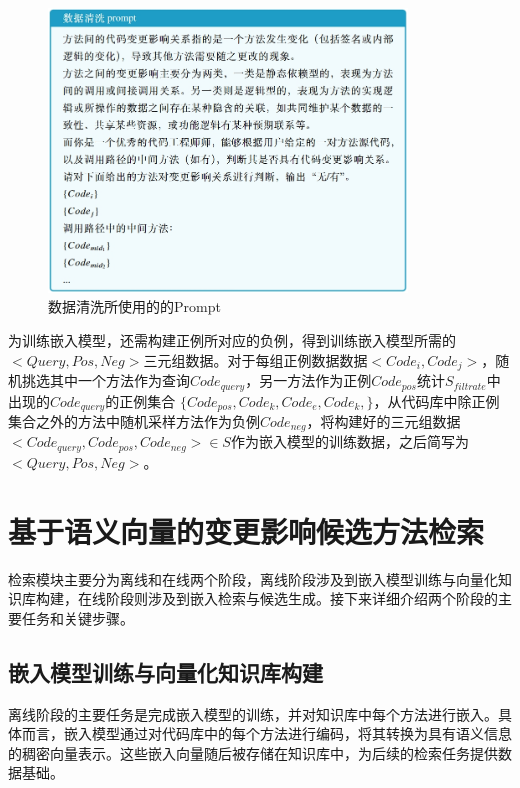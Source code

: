 \begin{figure}[htbp]
\centering
\includegraphics[width = 0.85\textwidth]{figures/2_数据清洗prompt.png}
\caption{数据清洗所使用的的Prompt}
\label{2_数据清洗prompt}
\end{figure}

为训练嵌入模型，还需构建正例所对应的负例，得到训练嵌入模型所需的$<Query,Pos,Neg>$三元组数据。对于每组正例数据数据$<Code_i,Code_j>$，随机挑选其中一个方法作为查询$Code_{query}$，另一方法作为正例$Code_{pos}$统计$S_{filtrate}$中出现的$Code_{query}$的正例集合 $\{Code_{pos},Code_k,Code_e,Code_k,\}$，从代码库中除正例集合之外的方法中随机采样方法作为负例$Code_{neg}$，将构建好的三元组数据$<Code_{query},Code_{pos},Code_{neg}>\in S$作为嵌入模型的训练数据，之后简写为$<Query,Pos,Neg>$。




\section{基于语义向量的变更影响候选方法检索}

检索模块主要分为离线和在线两个阶段，离线阶段涉及到嵌入模型训练与向量化知识库构建，在线阶段则涉及到嵌入检索与候选生成。接下来详细介绍两个阶段的主要任务和关键步骤。

\subsection{嵌入模型训练与向量化知识库构建}


离线阶段的主要任务是完成嵌入模型的训练，并对知识库中每个方法进行嵌入。具体而言，嵌入模型通过对代码库中的每个方法进行编码，将其转换为具有语义信息的稠密向量表示。这些嵌入向量随后被存储在知识库中，为后续的检索任务提供数据基础。

